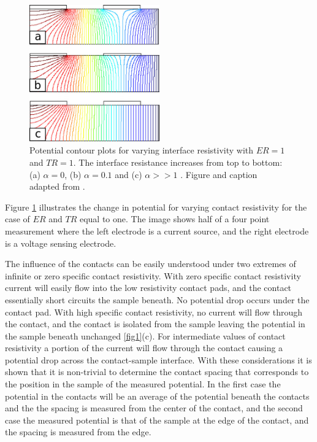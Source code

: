  
 \begin{figure}[]
  \centering
    \includegraphics[width=0.5\textwidth]{fig/4pp/finite_contact_contour.png}
 \caption{ Potential contour plots for varying interface resistivity with $ER=1$ and $TR= 1$. The interface resistance increases from top to bottom: (a) \hspace{.5mm} $\alpha=0$, (b) \hspace{.5mm} $\alpha=0.1$ and (c) \hspace{.5mm} $\alpha>> 1$ . Figure and caption adapted from \cite{Zimney2007CorrectionStudy}.}
 \label{fig2}
\end{figure}


Figure \ref{fig2} illustrates the change in potential for varying contact resistivity for the case of $ER$ and $TR$ equal to one. The image shows half of a four point measurement where the left electrode is a current source, and the right electrode is a voltage sensing electrode. 

The influence of the contacts can be easily understood under two extremes of infinite or zero specific contact resistivity. With zero specific contact resistivity current will easily flow into the low resistivity contact pads, and the contact essentially short circuits the sample beneath. No potential drop occurs under the contact pad. With high specific contact resistivity, no current will flow through the contact, and the contact is isolated from the sample leaving the potential in the sample beneath unchanged \ref{fig1}(c). For intermediate values of contact resistivity a portion of the current will flow through the contact causing a potential drop across the contact-sample interface.
With these considerations it is shown that it is non-trivial  to determine the contact spacing that corresponds to the position in the sample of the measured potential. In the first case the potential in the contacts will be an average of the potential beneath the contacts \cite{Zimney2007CorrectionStudy} %
and the the spacing is measured from the center of the contact, and the second case the measured potential is that of the sample at the edge of the contact, and the spacing is measured from the edge.


